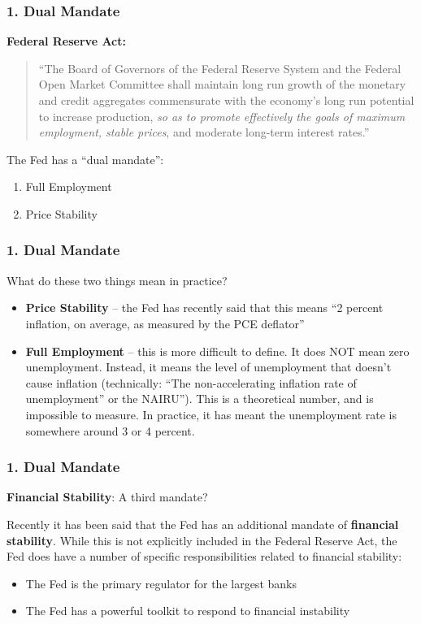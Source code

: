 \documentclass{beamer}
\begin{document}
\begin{frame}[t]
    \frametitle{1. Dual Mandate}

    \textbf{Federal Reserve Act:}
    \begin{quote}
    “The Board of Governors of the Federal Reserve System and the Federal Open Market Committee shall maintain long run growth of the monetary and credit aggregates commensurate with the economy's long run potential to increase production, \textit{so as to promote effectively the goals of maximum employment, stable prices}, and moderate long-term interest rates.”
    \end{quote} 
    \vspace{1em}

    The Fed has a “dual mandate”:
\begin{enumerate}
    \item Full Employment
    \item Price Stability
\end{enumerate}

\end{frame}

\begin{frame}[t]
    \frametitle{1. Dual Mandate}

    What do these two things mean in practice?
    
    \begin{itemize}
        \item \textbf{Price Stability} – the Fed has recently said that this means “2 percent inflation, on average, as measured by the PCE deflator”
        \item \textbf{Full Employment} – this is more difficult to define.   It does NOT mean zero unemployment.   Instead, it means the level of unemployment that doesn’t cause inflation (technically: “The non-accelerating inflation rate of unemployment” or the NAIRU”).   This is a theoretical number, and is impossible to measure.   In practice, it has meant the unemployment rate is somewhere around 3 or 4 percent.
    \end{itemize}

\end{frame}

\begin{frame}[t]
    \frametitle{1. Dual Mandate}

    \textbf{Financial Stability}: A third mandate?
    \vspace{1em}
    
    Recently it has been said that the Fed has an additional mandate of \textbf{financial stability}.   While this is not explicitly included in the Federal Reserve Act, the Fed does have a number of specific responsibilities related to financial stability:
    \begin{itemize}
        \item The Fed is the primary regulator for the largest banks
        \item The Fed has a powerful toolkit to respond to financial instability
    \end{itemize}

\end{frame}
\end{document}

